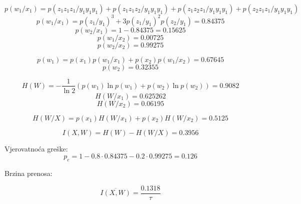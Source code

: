 \documentclass[12pt]{article}
\begin{document}
$$p(w_1 / x_1) = p(z_1z_1z_1 / y_1y_1y_1) + p(z_1z_1z_2 / y_1y_1y_1) + p(z_1z_2z_1 / y_1y_1y_1) + p(z_2z_1z_1 / y_1y_1y_1)$$
$$p(w_1 / x_1) = p(z_1 / y_1)^3 + 3 p(z_1 / y_1)^2 p(z_2 / y_1) = 0.84375$$
$$p(w_2 / x_1) = 1 - 0.84375 = 0.15625$$
$$p(w_1 / x_2) = 0.00725$$
$$p(w_2 / x_2) = 0.99275$$

$$p(w_1) = p(x_1) p(w_1 / x_1) + p(x_2) p(w_1 / x_2) = 0.67645$$
$$p(w_2) = 0.32355$$

$$H(W) = - \frac{1}{\ln{2}} ( p(w_1) \ln p(w_1) + p(w_2) \ln p(w_2) ) = 0.9082$$
$$H(W / x_1) = 0.625262$$
$$H(W / x_2) = 0.06195$$

$$H(W / X) = p(x_1) H(W / x_1) + p(x_2) H( W / x_2) = 0.5125$$

$$I(X, W) = H(W) - H(W / X) = 0.3956$$

Vjerovatnoća greške:
$$p_e = 1 - 0.8 \cdot 0.84375 - 0.2 \cdot 0.99275 = 0.126$$
 
Brzina prenosa:

$$\overline{I(X, W)} = \frac{0.1318}{\tau}$$
\end{document}
